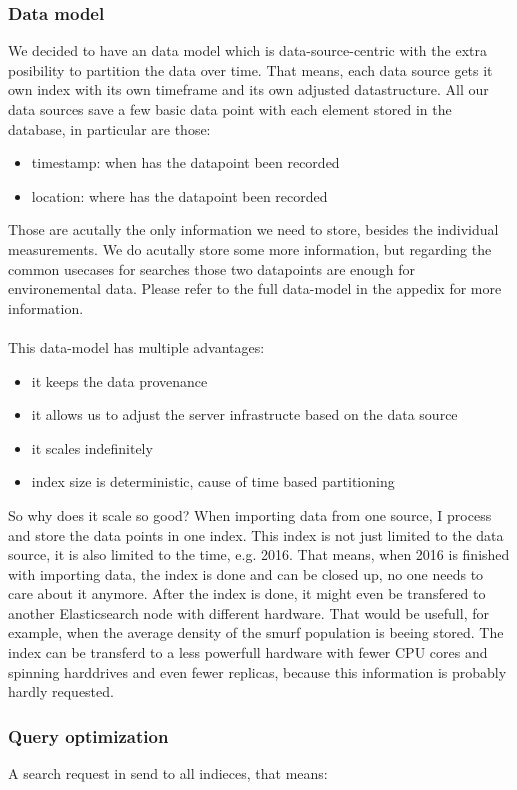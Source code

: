 \subsubsection{Data model}
We decided to have an data model which is data-source-centric with the extra posibility to partition the data over time. 
That means, each data source gets it own index with its own timeframe and its own adjusted datastructure. 
All our data sources save a few basic data point with each element stored in the database, in particular are those:
\begin{itemize}  
\item timestamp: when has the datapoint been recorded
\item location: where has the datapoint been recorded
\end{itemize}
Those are acutally the only information we need to store, besides the individual measurements. We do acutally store some more information, 
but regarding the common usecases for searches those two datapoints are enough for environemental data. Please refer to the full data-model in the appedix for more information.\\
\\
This data-model has multiple advantages:
\begin{itemize}  
\item it keeps the data provenance
\item it allows us to adjust the server infrastructe based on the data source
\item it scales indefinitely
\item index size is deterministic, cause of time based partitioning
\end{itemize}
So why does it scale so good? When importing data from one source, I process and store the data points in one index. This index is not just limited to the data source,
it is also limited to the time, e.g. 2016. That means, when 2016 is finished with importing data, the index is done and can be closed up, no one needs to care about it anymore.
After the index is done, it might even be transfered to another Elasticsearch node with different hardware.
That would be usefull, for example, when the average density of the smurf population is beeing stored. 
The index can be transferd to a less powerfull hardware with fewer CPU cores and spinning harddrives and even fewer replicas, 
because this information is probably hardly requested.
%
\subsubsection{Query optimization}
A search request in send to all indieces, that means:

